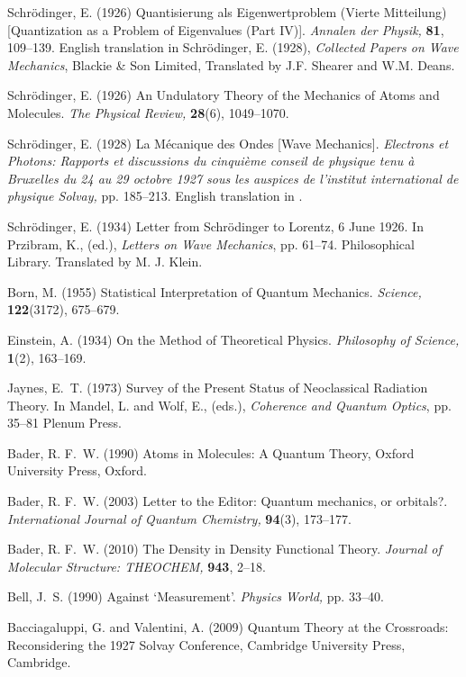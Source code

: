 \documentclass[12pt,onecolumn,secnumarabic,amsmath,amssymb,balancelastpage,nofootinbib]{article}
\begin{document}
\begin{thebibliography}{100}
Schr{\"o}dinger, E. (1926)
Quantisierung als Eigenwertproblem (Vierte Mitteilung) [Quantization as a
  Problem of Eigenvalues (Part IV)].
{\em Annalen der Physik,} {\bf 81}, 109--139.
English translation in Schr{\"o}dinger, E. (1928), \textit{Collected Papers on
  Wave Mechanics}, Blackie \& Son Limited, Translated by J.F. Shearer and W.M.
  Deans.

Schr{\"o}dinger, E. (1926)
An Undulatory Theory of the Mechanics of Atoms and Molecules.
{\em The Physical Review,} {\bf 28}(6), 1049--1070.

Schr{\"o}dinger, E. (1928)
La M\'{e}canique des Ondes [Wave Mechanics].
{\em Electrons et Photons: Rapports et discussions du cinqui\`{e}me conseil de
  physique tenu \`{a} Bruxelles du 24 au 29 octobre 1927 sous les auspices de
  l'institut international de physique Solvay,} pp. 185--213.
English translation in \cite{bacciagaluppi2009}.

Schr{\"o}dinger, E. (1934)
Letter from Schr{\"o}dinger to Lorentz, 6 June 1926.
In Przibram, K., (ed.), \emph{Letters on Wave Mechanics},  pp. 61--74.
  Philosophical Library.
Translated by M. J. Klein.

Born, M. (1955)
Statistical Interpretation of Quantum Mechanics.
{\em Science,} {\bf 122}(3172), 675--679.

Einstein, A. (1934)
On the Method of Theoretical Physics.
{\em Philosophy of Science,} {\bf 1}(2), 163--169.

Jaynes, E.~T. (1973)
Survey of the Present Status of Neoclassical Radiation Theory.
In Mandel, L. and Wolf, E., (eds.), \emph{Coherence and Quantum Optics},  pp.
  35--81 Plenum Press.

Bader, R. F.~W. (1990)
Atoms in Molecules: A Quantum Theory,
Oxford University Press, Oxford.

Bader, R. F.~W. (2003)
Letter to the Editor: Quantum mechanics, or orbitals?.
{\em International Journal of Quantum Chemistry,} {\bf 94}(3), 173--177.

Bader, R. F.~W. (2010)
The Density in Density Functional Theory.
{\em Journal of Molecular Structure: THEOCHEM,} {\bf 943}, 2--18.

Bell, J.~S. (1990)
Against `Measurement'.
{\em Physics World,} pp. 33--40.

Bacciagaluppi, G. and Valentini, A. (2009)
Quantum Theory at the Crossroads: Reconsidering the 1927 Solvay Conference,
Cambridge University Press, Cambridge.


\end{thebibliography}
\end{document}
